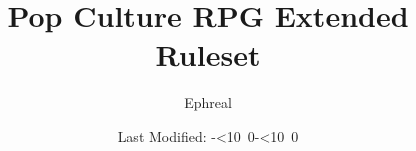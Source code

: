 \def\mytoday{\leavevmode\hbox{\the\year-\twodigits\month-\twodigits\day}}
\def\twodigits#1{\ifnum#1<10 0\fi\the#1}

\title{Pop Culture RPG Extended Ruleset}
\author{Ephreal}
\date{Last Modified: \mytoday}
\maketitle
\tableofcontents
